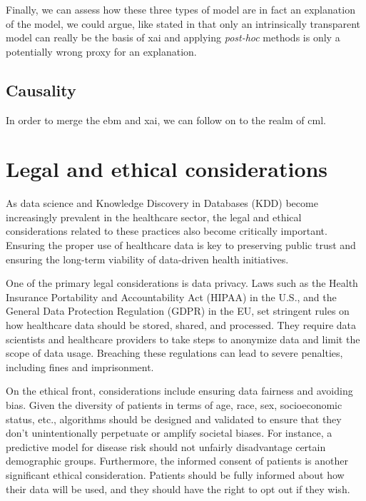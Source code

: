 Finally, we can assess how these three types of model are in fact an explanation of the model, we could argue, like stated in \cite{rudinStopExplainingBlack2019} that only an intrinsically transparent model can really be the basis of \ac{xai} and applying \textit{post-hoc} methods is only a potentially wrong proxy for an explanation.


\subsection{Causality}

In order to merge the \ac{ebm} and \ac{xai}, we can follow on to the realm of \ac{cml}.



\section{Legal and ethical considerations}



As data science and Knowledge Discovery in Databases (KDD) become increasingly prevalent in the healthcare sector, the legal and ethical considerations related to these practices also become critically important. Ensuring the proper use of healthcare data is key to preserving public trust and ensuring the long-term viability of data-driven health initiatives.

One of the primary legal considerations is data privacy. Laws such as the Health Insurance Portability and Accountability Act (HIPAA) in the U.S., and the General Data Protection Regulation (GDPR) in the EU, set stringent rules on how healthcare data should be stored, shared, and processed. They require data scientists and healthcare providers to take steps to anonymize data and limit the scope of data usage. Breaching these regulations can lead to severe penalties, including fines and imprisonment.

On the ethical front, considerations include ensuring data fairness and avoiding bias. Given the diversity of patients in terms of age, race, sex, socioeconomic status, etc., algorithms should be designed and validated to ensure that they don't unintentionally perpetuate or amplify societal biases. For instance, a predictive model for disease risk should not unfairly disadvantage certain demographic groups. Furthermore, the informed consent of patients is another significant ethical consideration. Patients should be fully informed about how their data will be used, and they should have the right to opt out if they wish.

